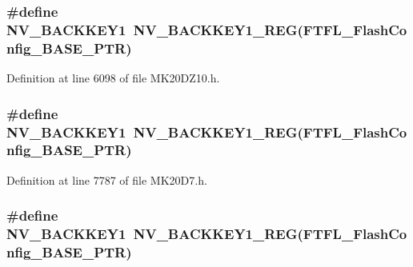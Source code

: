 \subsubsection[{\texorpdfstring{N\+V\+\_\+\+B\+A\+C\+K\+K\+E\+Y1}{NV_BACKKEY1}}]{\setlength{\rightskip}{0pt plus 5cm}\#define N\+V\+\_\+\+B\+A\+C\+K\+K\+E\+Y1~{\bf N\+V\+\_\+\+B\+A\+C\+K\+K\+E\+Y1\+\_\+\+R\+EG}({\bf F\+T\+F\+L\+\_\+\+Flash\+Config\+\_\+\+B\+A\+S\+E\+\_\+\+P\+TR})}\hypertarget{group___n_v___register___accessor___macros_gae849f8e6eaa76305b07c567463074dc9}{}\label{group___n_v___register___accessor___macros_gae849f8e6eaa76305b07c567463074dc9}


Definition at line 6098 of file M\+K20\+D\+Z10.\+h.

\subsubsection[{\texorpdfstring{N\+V\+\_\+\+B\+A\+C\+K\+K\+E\+Y1}{NV_BACKKEY1}}]{\setlength{\rightskip}{0pt plus 5cm}\#define N\+V\+\_\+\+B\+A\+C\+K\+K\+E\+Y1~{\bf N\+V\+\_\+\+B\+A\+C\+K\+K\+E\+Y1\+\_\+\+R\+EG}({\bf F\+T\+F\+L\+\_\+\+Flash\+Config\+\_\+\+B\+A\+S\+E\+\_\+\+P\+TR})}\hypertarget{group___n_v___register___accessor___macros_gae849f8e6eaa76305b07c567463074dc9}{}\label{group___n_v___register___accessor___macros_gae849f8e6eaa76305b07c567463074dc9}


Definition at line 7787 of file M\+K20\+D7.\+h.

\subsubsection[{\texorpdfstring{N\+V\+\_\+\+B\+A\+C\+K\+K\+E\+Y1}{NV_BACKKEY1}}]{\setlength{\rightskip}{0pt plus 5cm}\#define N\+V\+\_\+\+B\+A\+C\+K\+K\+E\+Y1~{\bf N\+V\+\_\+\+B\+A\+C\+K\+K\+E\+Y1\+\_\+\+R\+EG}({\bf F\+T\+F\+L\+\_\+\+Flash\+Config\+\_\+\+B\+A\+S\+E\+\_\+\+P\+TR})}\hypertarget{group___n_v___register___accessor___macros_gae849f8e6eaa76305b07c567463074dc9}{}\label{group___n_v___register___accessor___macros_gae849f8e6eaa76305b07c567463074dc9}


